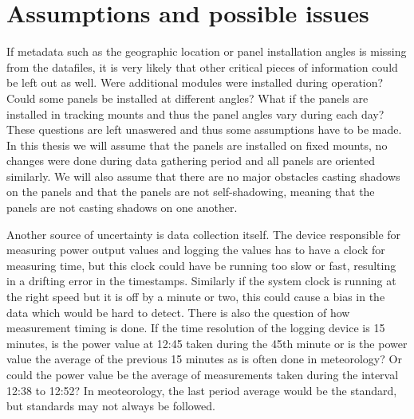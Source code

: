 


\section{Assumptions and possible issues}
If metadata such as the geographic location or panel installation angles is missing from the datafiles, it is very likely that other critical pieces of information could be left out as well. Were additional modules were installed during operation? Could some panels be installed at different angles? What if the panels are installed in tracking mounts and thus the panel angles vary during each day? These questions are left unaswered and thus some assumptions have to be made. In this thesis we will assume that the panels are installed on fixed mounts, no changes were done during data gathering period and all panels are oriented similarly. We will also assume that there are no major obstacles casting shadows on the panels and that the panels are not self-shadowing, meaning that the panels are not casting shadows on one another.

Another source of uncertainty is data collection itself. The device responsible for measuring power output values and logging the values has to have a clock for measuring time, but this clock could have be running too slow or fast, resulting in a drifting error in the timestamps. Similarly if the system clock is running at the right speed but it is off by a minute or two, this could cause a bias in the data which would be hard to detect. There is also the question of how measurement timing is done. If the time resolution of the logging device is 15 minutes, is the power value at 12:45 taken during the 45th minute or is the power value the average of the previous 15 minutes as is often done in meteorology? Or could the power value be the average of measurements taken during the interval 12:38 to 12:52? In meoteorology, the last period average would be the standard, but standards may not always be followed.

